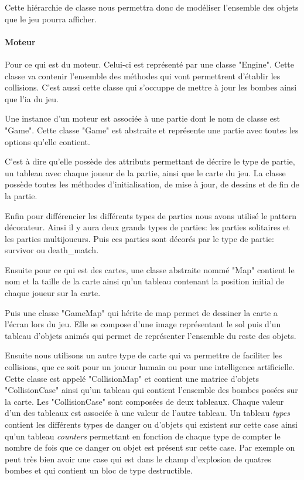 		Cette hiérarchie de classe nous permettra donc de modéliser l'ensemble 
		des objets que le jeu pourra afficher.
	
	
	\paragraph{Moteur\\}
	
		Pour ce qui est du moteur.
		Celui-ci est représenté par une classe "Engine".
		Cette classe va contenir l'ensemble des méthodes qui vont permettrent 
		d'établir les collisions.
		C'est aussi cette classe qui s'occuppe de mettre à jour les bombes 
		ainsi que l'\gls{ia} du jeu.
		
		Une instance d'un moteur est associée à une partie dont le nom de classe est "Game".
		Cette classe "Game" est abstraite et représente une partie avec toutes les options qu'elle contient.
		
		C'est à dire qu'elle possède des attributs permettant de décrire le type de partie,
		un tableau avec chaque joueur de la partie, ainsi que le carte du jeu.
		La classe possède toutes les méthodes d'initialisation, de mise à jour,
		 de dessins et de fin de la partie.
		
		Enfin pour différencier les différents types de parties nous avons utilisé
		 le \gls{pattern} décorateur.
		 Ainsi il y aura deux grands types de parties: les parties solitaires 
		 et les parties multijoueurs.
		 Puis ces parties sont décorés par le type de partie: \gls{survivor} ou \gls{death_match}.
	
		Ensuite pour ce qui est des cartes, une classe abstraite nommé "Map" 
		contient le nom et la taille de la carte ainsi qu'un tableau contenant 
		la position initial de chaque joueur sur la carte.
		
		Puis une classe "GameMap" qui hérite de map permet de dessiner 
		la carte a l'écran lors du jeu.
		Elle se compose d'une image représentant le sol puis d'un tableau 
		d'objets animés qui permet de représenter l'ensemble du reste des objets.
		
		Ensuite nous utilisons un autre type de carte qui va permettre de 
		faciliter les collisions, que ce soit pour un joueur humain ou pour 
		une intelligence artificielle.
		Cette classe est appelé "CollisionMap" et contient une matrice d'objets
		"CollisionCase" ainsi qu'un tableau qui contient l'ensemble des bombes 
		posées sur la carte.
		Les "CollisionCase" sont composées de deux tableaux.
		Chaque valeur d'un des tableaux est associée à une valeur de l'autre tableau.
		Un tableau \textit{types} contient les différents types de danger ou d'objets 
		qui existent sur cette case ainsi qu'un tableau \textit{counters} permettant 
		en fonction de chaque type de compter le nombre de fois que ce danger ou objet 
		est présent sur cette case.
		Par exemple on peut très bien avoir une case qui est dans le champ d'explosion
		de quatres bombes et qui contient un bloc de type destructible.
		
